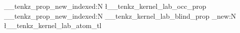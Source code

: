 %
%
%
%
\__tenkz_prop_new_indexed:N \l__tenkz_kernel_lab_occ_prop %
\__tenkz_prop_new_indexed:N \g__tenkz_kernel_lab_blind_prop %
\tl_new:N \l__tenkz_kernel_lab_atom_tl

